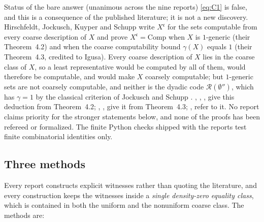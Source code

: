 \documentclass[11pt,letterpaper]{article}
\theoremstyle{definition}
\numberwithin{equation}{section}
\newcommand{\Comp}{\mathrm{Comp}}
\newcommand{\Rc}{\mathcal R}
\newcommand{\rep}[1]{\leavevmode{\sffamily\small\color{Steel}R#1}}
\begin{document}
\begin{assessment}{Status of the bare answer (unanimous across the nine reports)}
\eqref{eq:C1} is false, and this is a consequence of the published literature; it is not a new discovery. Hirschfeldt, Jockusch, Kuyper and Schupp \cite{HJKS} write $X^{\mathfrak c}$ for the sets computable from every coarse description of $X$ and prove $X^{\mathfrak c}=\Comp$ when $X$ is $1$-generic (their Theorem~4.2) and when the coarse computability bound $\gamma(X)$ equals $1$ (their Theorem~4.3, credited to Igusa). Every coarse description of $X$ lies in the coarse class of $X$, so a least representative would be computed by all of them, would therefore be computable, and would make $X$ coarsely computable; but $1$-generic sets are not coarsely computable, and neither is the dyadic code $\Rc(\emptyset'')$, which has $\gamma=1$ by the classical criterion of Jockusch and Schupp \cite[Theorem~2.19]{JS}. \rep1, \rep2, \rep5, \rep6 give this deduction from Theorem~4.2; \rep3, \rep4, \rep9 give it from Theorem~4.3; \rep7, \rep8 refer to it. No report claims priority for the stronger statements below, and none of the proofs has been refereed or formalized. The finite Python checks shipped with the reports test finite combinatorial identities only.
\end{assessment}

\subsection{Three methods}
Every report constructs explicit witnesses rather than quoting the literature, and every construction keeps the witnesses inside a \emph{single density-zero equality class}, which is contained in both the uniform and the nonuniform coarse class. The methods are:
\end{document}
